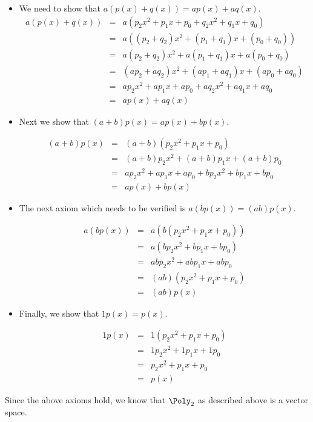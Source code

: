 \begin{solution}
\begin{itemize}
\item
We need to show that $a(p(x) + q(x)) = ap(x) + aq(x)$. 
\begin{eqnarray*}
a(p(x) + q(x)) &=& a \left( p_2x^2 + p_1x + p_0 + q_2x^2 + q_1x + q_0 \right)\\
&=& a \left(  (p_2+q_2)x^2 + (p_1+q_1)x + (p_0+q_0)  \right)\\
&=&  a(p_2+q_2)x^2  + a(p_1+q_1)x +  a(p_0 + q_0) \\
&=& (ap_2 + aq_2)x^2 + (ap_1+aq_1)x + (ap_0 + aq_0)  \\
&=&  ap_2x^2 + ap_1x + ap_0 + aq_2x^2 +aq_1x + aq_0\\
&=& ap(x) + aq(x) 
\end{eqnarray*}

\item
Next we show that $(a+b) p(x) = ap(x) + bp(x)$. 

\begin{eqnarray*} 
(a+b) p(x) &=& (a+b) ( p_2x^2 + p_1x + p_0)\\
&=& (a+b)p_2x^2 + (a+b)p_1x + (a+b)p_0   \\
&=&  ap_2x^2 + ap_1x + ap_0 + bp_2x^2 +bp_1x + bp_0\\
&=& ap(x) + bp(x)
\end{eqnarray*}

\item
The next axiom which needs to be verified is $a(bp(x)) = (ab)p(x)$. 

\begin{eqnarray*}
a(bp(x)) &=& a \left(  b \left(p_2x^2 + p_1x +p_0\right)\right) \\
&=& a \left(  bp_2x^2 +bp_1x + bp_0 \right)\\
&=&  abp_2x^2 + abp_1x + abp_0 \\
&=& (ab) \left( p_2x^2 +p_1x + p_0 \right)\\
&=& (ab) p(x) 
\end{eqnarray*}

\item 
Finally, we show that $1p(x) = p(x)$. 

\begin{eqnarray*}
1p(x) &=& 1 \left(  p_2x^2  + p_1x +  p_0\right)\\
&=&  1p_2x^2 + 1p_1x + 1p_0\\
&=&  p_2x^2 + p_1x + p_0\\
&=& p(x)
\end{eqnarray*}

\end{itemize}

Since the above axioms hold, we know that $\Poly_2$ as described above is a vector space. 
\end{solution}

